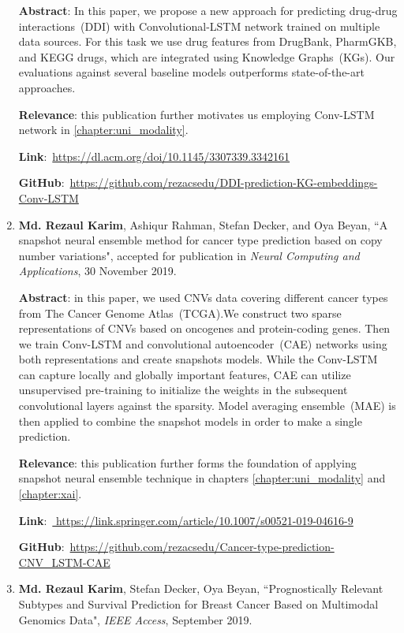 \begin{enumerate}
	\textbf{Abstract}: In this paper, we propose a new approach for predicting drug-drug interactions~(DDI) with Convolutional-LSTM network trained on multiple data sources. For this task we use drug features from DrugBank, PharmGKB, and KEGG drugs, which are integrated using Knowledge Graphs~(KGs). Our evaluations against several baseline models outperforms state-of-the-art approaches. 
	
	\textbf{Relevance}: this publication further motivates us employing Conv-LSTM network in \cref{chapter:uni_modality}.
	
	\textbf{Link}:~\url{https://dl.acm.org/doi/10.1145/3307339.3342161}

	\textbf{GitHub}:~\url{https://github.com/rezacsedu/DDI-prediction-KG-embeddings-Conv-LSTM}
	
	\item \textbf{Md. Rezaul Karim}, Ashiqur Rahman, Stefan Decker, and Oya Beyan, ``A snapshot neural ensemble method for cancer type prediction based on copy number variations", accepted for publication in \emph{Neural Computing and Applications}, 30 November 2019. 
	
	\textbf{Abstract}: in this paper, we used CNVs data covering different cancer types from The Cancer Genome Atlas~(TCGA).We construct two sparse representations of CNVs based on oncogenes and protein-coding genes. Then we train Conv-LSTM and convolutional autoencoder~(CAE) networks using both representations and create snapshots models. While the Conv-LSTM can capture locally and globally important features, CAE can utilize unsupervised pre-training to initialize the weights in the subsequent convolutional layers against the sparsity. Model averaging ensemble~(MAE) is then applied to combine the snapshot models in order to make a single prediction. 
	
	\textbf{Relevance}: this publication further forms the foundation of applying snapshot neural ensemble technique in chapters \ref{chapter:uni_modality} and \ref{chapter:xai}.
	
	\textbf{Link}:~\url{	https://link.springer.com/article/10.1007/s00521-019-04616-9}
	
	\textbf{GitHub}:~\url{https://github.com/rezacsedu/Cancer-type-prediction-CNV_LSTM-CAE} 
	
	\item \textbf{Md. Rezaul Karim}, Stefan Decker, Oya Beyan, ``Prognostically Relevant Subtypes and Survival Prediction for Breast Cancer Based on Multimodal Genomics Data", \emph{IEEE Access}, September 2019.
	

\end{enumerate}
